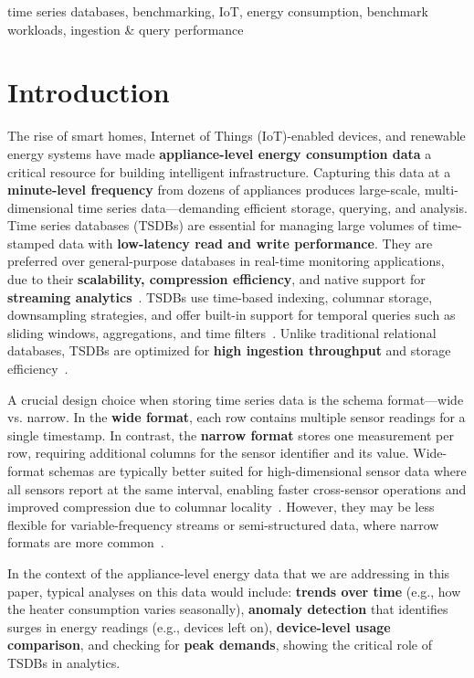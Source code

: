\documentclass[conference]{IEEEtran}
\begin{document}
\begin{IEEEkeywords}
time series databases, benchmarking, IoT, energy consumption, benchmark workloads, ingestion \& query performance
\end{IEEEkeywords}

\section{Introduction}
The rise of smart homes, Internet of Things (IoT)-enabled devices, and renewable energy systems have made \textbf{appliance-level energy consumption data} a critical resource for building intelligent infrastructure. Capturing this data at a \textbf{minute-level frequency} from dozens of appliances produces large-scale, multi-dimensional time series data—demanding efficient storage, querying, and analysis. Time series databases (TSDBs) are essential for managing large volumes of time-stamped data with \textbf{low-latency read and write performance}. They are preferred over general-purpose databases in real-time monitoring applications, due to their \textbf{scalability, compression efficiency}, and native support for \textbf{streaming analytics}~\cite{1_tsmbench2023}. TSDBs use time-based indexing, columnar storage, downsampling strategies, and offer built-in support for temporal queries such as sliding windows, aggregations, and time filters~\cite{1_tsmbench2023}.  Unlike traditional relational databases, TSDBs are optimized for \textbf{high ingestion throughput} and storage efficiency~\cite{1_tsmbench2023,2_tsmsurvey2017}. 

A crucial design choice when storing time series data is the schema format—wide vs. narrow. In the \textbf{wide format}, each row contains multiple sensor readings for a single timestamp. In contrast, the \textbf{narrow format} stores one measurement per row, requiring additional columns for the sensor identifier and its value. Wide-format schemas are typically better suited for high-dimensional sensor data where all sensors report at the same interval, enabling faster cross-sensor operations and improved compression due to columnar locality~\cite{6_clickbench}. However, they may be less flexible for variable-frequency streams or semi-structured data, where narrow formats are more common~\cite{2_tsmsurvey2017}.

In the context of the appliance-level energy data that we are addressing in this paper, typical analyses on this data would include: \textbf{trends over time} (e.g., how the heater consumption varies seasonally), \textbf{anomaly detection} that identifies surges in energy readings (e.g., devices left on), \textbf{device-level usage comparison}, and checking for \textbf{peak demands}, showing the critical role of TSDBs in analytics. 
\end{document}

